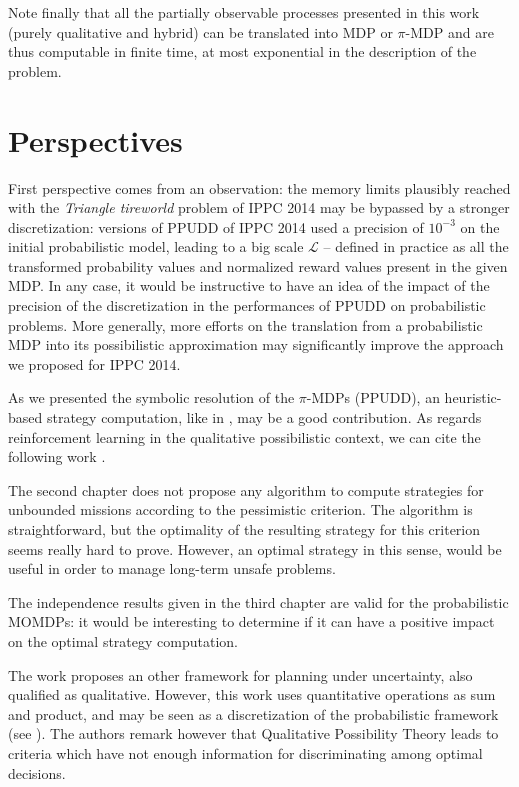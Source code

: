 Note finally that all the partially observable processes presented in this work
(purely qualitative and hybrid)
can be translated into MDP or $\pi$-MDP
and are thus computable in finite time, 
at most exponential in the description of the problem.
\section*{Perspectives}
First perspective comes from an observation:
the memory limits plausibly reached with the \textit{Triangle tireworld} 
problem of IPPC 2014 may be bypassed by a stronger discretization: 
versions of PPUDD of IPPC 2014 used a precision of $10^{-3}$
on the initial probabilistic model, leading to a big scale $\mathcal{L}$
-- defined in practice as all the transformed probability values and normalized reward	 values
present in the given MDP.
In any case, it would be instructive to have an idea
of the impact of the precision of the discretization
in the performances of PPUDD on probabilistic problems. 
More generally, more efforts 
on the translation 
from a probabilistic MDP into 
its possibilistic approximation
may significantly improve 
the approach we proposed for IPPC 2014.

As we presented the symbolic resolution of the $\pi$-MDPs (PPUDD), 
an heuristic-based strategy computation, 
like in \cite{DBLP:conf/aaai/Teichteil-KonigsbuchVI11},
may be a good contribution.
As regards reinforcement learning 
in the qualitative possibilistic context,
we can cite the following work \cite{DBLP:conf/fuzzIEEE/Sabbadin01}.

The second chapter does not propose any algorithm
to compute strategies 
for unbounded missions
according to the pessimistic criterion. 
The algorithm is straightforward, 
but the optimality of the resulting strategy 
for this criterion
seems really hard to prove.
However, an optimal strategy 
in this sense,
would be useful
in order to manage 
long-term unsafe problems. 

The independence results given in the third chapter
are valid for the probabilistic MOMDPs: 
it would be interesting to determine if it can have
a positive impact on the optimal strategy computation.

The work \cite{Bonet:2002:QMP:2073876.2073884} proposes an other framework
for planning under uncertainty, also qualified as qualitative. 
However, this work uses quantitative operations
as sum and product, and may be seen as a discretization of the probabilistic framework
(see \cite{Wilson:1995:OMC:2074158.2074221}).
The authors remark however that Qualitative Possibility Theory leads to 
criteria which have not enough information for discriminating
among optimal decisions.

